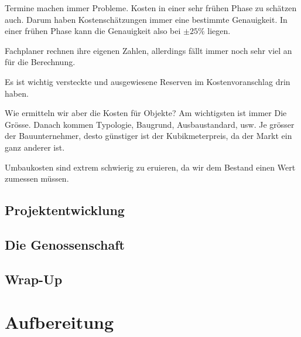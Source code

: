 \documentclass[11pt]{article}
\begin{document}
Termine machen immer Probleme. Kosten in einer sehr frühen Phase zu schätzen
auch. Darum haben Kostenschätzungen immer eine bestimmte Genauigkeit. In
einer frühen Phase kann die Genauigkeit also bei $\pm 25\%$ liegen.

Fachplaner rechnen ihre eigenen Zahlen, allerdings fällt immer noch sehr viel
an für die Berechnung.

Es ist wichtig versteckte und ausgewiesene Reserven im Kostenvoranschlag drin
haben.

Wie ermitteln wir aber die Kosten für Objekte? Am wichtigsten ist immer Die
Grösse. Danach kommen Typologie, Baugrund, Ausbaustandard, usw. Je grösser
der Bauunternehmer, desto günstiger ist der Kubikmeterpreis, da der Markt ein
ganz anderer ist.

Umbaukosten sind extrem schwierig zu eruieren, da wir dem Bestand einen Wert
zumessen müssen. 

\subsection{Projektentwicklung}
\label{sec-2-6}

\subsection{Die Genossenschaft}
\label{sec-2-7}

\subsection{Wrap-Up}
\label{sec-2-8}

\section{Aufbereitung}
\label{sec-3}
\end{document}
